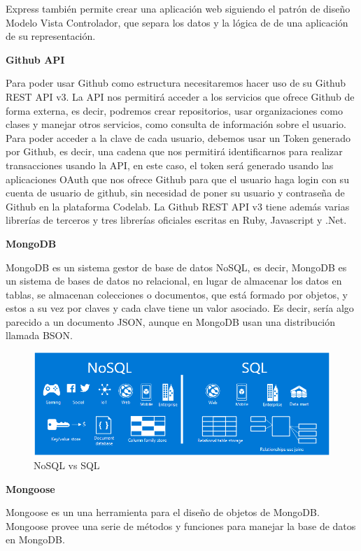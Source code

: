 Express también permite crear una aplicación web siguiendo el patrón de diseño Modelo Vista Controlador, que separa los datos y la lógica de de una aplicación de su representación.

{\bf Github API}

Para poder usar Github como estructura necesitaremos hacer uso de su Github REST API v3. 
La API nos permitirá acceder a los servicios que ofrece Github de forma externa, es decir, podremos crear repositorios, usar organizaciones como clases y manejar otros servicios, como consulta de información sobre el usuario.
Para poder acceder a la clave de cada usuario, debemos usar un Token generado por Github, es decir, una cadena que nos permitirá  identificarnos para realizar transacciones usando la API, en este caso, el token será generado usando las aplicaciones OAuth que nos ofrece Github para que el usuario haga login con su cuenta de usuario de github, sin necesidad de poner su usuario y contraseña de Github en la plataforma Codelab.
La Github REST API v3 tiene además varias librerías de terceros y tres librerías oficiales escritas en Ruby, Javascript y .Net.

{\bf MongoDB}

MongoDB es un sistema gestor de base de datos NoSQL, es decir, MongoDB es un sistema de bases de datos no relacional, en lugar de almacenar los datos en tablas, se almacenan colecciones o documentos, que está formado por objetos, y estos a su vez por claves y cada clave tiene un valor asociado. Es decir, sería algo parecido a un documento JSON, aunque en MongoDB usan una distribución llamada BSON.

\begin{figure}[!th]
\begin{center}
\includegraphics[scale=0.5]{images/nosql}
\caption{NoSQL vs SQL}
\label{fig:NoSQL vs SQL}
\end{center}
\end{figure}

{\bf Mongoose}

Mongoose es un una herramienta para el diseño de objetos de MongoDB. 
Mongoose provee una serie de métodos y funciones para manejar la base de datos en MongoDB.

